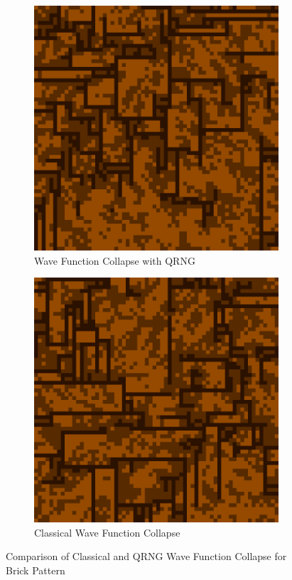 \documentclass[10pt]{article}
\begin{document}
\begin{figure}[h]
\centering
\begin{subfigure}{.5\textwidth}
  \centering
  \includegraphics[scale=0.2]{bricksResultQRNG}
  \caption{Wave Function Collapse with QRNG}
  \label{fig:brickqrng}
\end{subfigure}%
\begin{subfigure}{.5\textwidth}
  \centering
  \includegraphics[scale=0.2]{bricksResultClassical}
  \caption{Classical Wave Function Collapse}
  \label{fig:brickclass}
\end{subfigure}
\caption{Comparison of Classical and QRNG Wave Function Collapse for Brick Pattern}
\label{fig:brickcompare}
\end{figure}
\vfill
\end{document}
